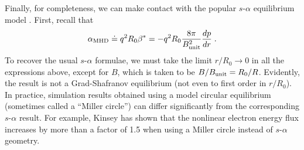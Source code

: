 Finally, for completeness, we can make contact with the popular 
$s$-$\alpha$ equilibrium model \cite{connor:1978}.  First, recall 
that 
%
\begin{equation}
\alpha_{\rm MHD} \doteq q^2 R_0 \beta^* = - q^2 R_0 \frac{8 \pi}{B_{\rm unit}^2} 
\frac{dp}{dr} \; .
\end{equation} 
%
To recover the usual $s$-$\alpha$ formulae, we must take the limit 
$r/R_0 \rightarrow 0$ in all the expressions above, except for $B$, 
which is taken to be $B/B_{\rm unit} = R_0/R$.  
Evidently, the result is not a Grad-Shafranov equilibrium
(not even to first order in $r/R_0$).  In practice, simulation 
results obtained using a model circular equilibrium (sometimes 
called a ``Miller circle'') can differ significantly from the 
corresponding $s$-$\alpha$ result.  For example, Kinsey 
\cite{kinsey:2007} has shown that the nonlinear electron energy 
flux increases by more than a factor of 1.5 when using a Miller 
circle instead of $s$-$\alpha$ geometry. 

